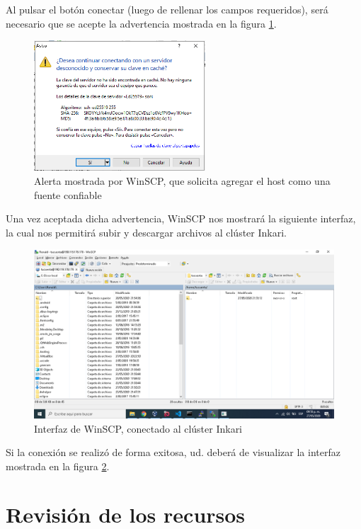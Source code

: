 \documentclass[a4paper,11pt]{article}
\begin{document}
Al pulsar el botón conectar (luego de rellenar los campos requeridos), será necesario que se acepte la advertencia mostrada en la figura \ref{fig:winscp_alerta}.

\begin{figure}[!ht]
    \centering
    \includegraphics[width=6.4cm]{winscp_alerta}
    \caption{Alerta mostrada por WinSCP, que solicita agregar el host como una fuente confiable}
    \label{fig:winscp_alerta}
\end{figure}

Una vez aceptada dicha advertencia, WinSCP nos mostrará la siguiente interfaz, la cual nos permitirá subir y descargar archivos al clúster Inkari.

\begin{figure}[!ht]
    \centering
    \includegraphics[width=13.7cm]{winscp_conectado}
    \caption{Interfaz de WinSCP, conectado al clúster Inkari}
    \label{fig:winscp_conectado}
\end{figure}

\newpage

Si la conexión se realizó de forma exitosa, ud. deberá de visualizar la interfaz mostrada en la figura \ref{fig:winscp_conectado}.

\section{Revisión de los recursos}
\end{document}
